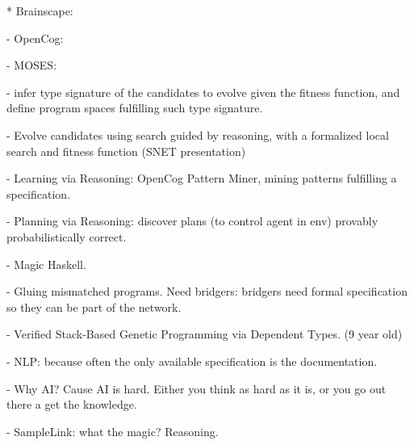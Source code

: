 \documentclass[aspectratio=169]{beamer}
\begin{document}
\begin{frame}
* Brainscape:

  - OpenCog:
  
    - MOSES:

      - infer type signature of the candidates to evolve given the
      fitness function, and define program spaces fulfilling such type
      signature.

      - Evolve candidates using search guided by reasoning, with a
      formalized local search and fitness function (SNET presentation)

    - Learning via Reasoning: OpenCog Pattern Miner, mining patterns
    fulfilling a specification.

    - Planning via Reasoning: discover plans (to control agent in env)
    provably probabilistically correct.

  - Magic Haskell.

  - Gluing mismatched programs. Need bridgers: bridgers need formal
  specification so they can be part of the network.

  - Verified Stack-Based Genetic Programming via Dependent Types. (9
  year old)
  
  - NLP: because often the only available specification is the
  documentation.

  - Why AI? Cause AI is hard. Either you think as hard as it is, or
  you go out there a get the knowledge.

  - SampleLink: what the magic? Reasoning.
\end{frame}
\end{document}
